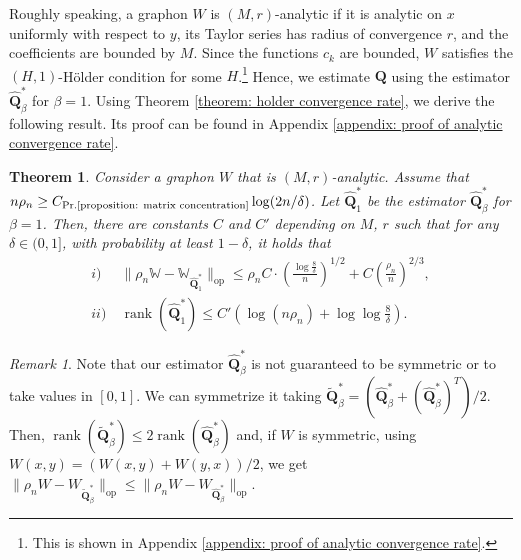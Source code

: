 \documentclass[11pt]{article}
\newcommand{\bQ}{\bm{Q}}
\newcommand{\bQhat}{\widehat{\bm{Q}}}
\newcommand{\opnorm}[1]{\|#1\|_{\mathrm{op}}}
\newcommand{\bbW}{\mathbb{W}}
\newcommand{\constantBandeira}{C_{\text{Pr.\ref{proposition: matrix concentration}}}}
\newcommand{\<}{\langle}
\renewcommand{\>}{\rangle}
\DeclareMathOperator{\rank}{rank}
\theoremstyle{plain}
\newtheorem{theorem}{Theorem}
\theoremstyle{definition}
\theoremstyle{remark}
\newtheorem{remark}{Remark}
\begin{document}
Roughly speaking, a graphon $W$ is $(M,r)$-analytic if it is analytic on $x$ uniformly with respect to $y$, its Taylor series has radius of convergence $r$, and the coefficients are bounded by $M$. Since the functions $c_k$ are bounded, $W$ satisfies the $(H, 1)$-H\"older condition for some $H$.\footnote{This is shown in Appendix \ref{appendix: proof of analytic convergence rate}.} Hence, we estimate $\bQ$ using the estimator $\widehat{\bQ}^*_{\beta}$ for $\beta = 1$. Using Theorem \ref{theorem: holder convergence rate}, we derive the following result. Its proof can be found in Appendix \ref{appendix: proof of analytic convergence rate}. 

\begin{theorem}
\label{theorem: analityc convergence rate}
Consider a graphon $W$ that is $(M,r)$-analytic. Assume that $n \rho_n \ge \constantBandeira \log (2 n/\delta)$. Let $\widehat{\bQ}_{1}^*$ be the estimator $\widehat{\bQ}^*_{\beta}$ for $\beta = 1$. Then, there are constants $C$ and $C'$ depending on $M$, $r$ such that for any $\delta \in (0,1]$, with probability at least $1 - \delta$, it holds that
    \begin{align*}
        i)&\ \opnorm{\rho_n \bbW - \bbW_{\widehat{\bQ}^*_{1}}}  \le \rho_n  C \cdot \left ( \frac{\log \frac{8}{\delta}}{n} \right )^{1/2} + C \left (\frac{\rho_n}{n} \right )^{2/3}, \\
        ii)&\ \rank (\widehat{\bQ}^*_{1})  \le C' \left (\log (n \rho_n) + \log \log \frac{8}{\delta} \right ).
    \end{align*}
\end{theorem}


\begin{remark}
    Note that our estimator $\bQhat^*_\beta$ is not guaranteed to be symmetric or to take values in $[0,1]$. We can symmetrize it taking $\widetilde {\bQ}^*_\beta=(\bQhat^*_\beta+(\bQhat^*_\beta)^T)/2$. Then, $\rank (\widetilde {\bQ}^*_\beta)\leq 2 \rank (\bQhat^*_\beta)$ and, if $W$ is symmetric, using $W(x,y)=(W(x,y)+W(y,x))/2$, we get 
    $\opnorm{\rho_n W - W_{\widetilde {\bQ}^*_\beta}}\leq \opnorm{\rho_n W - W_{\bQhat^*_\beta}}$.
\end{remark}
\end{document}
